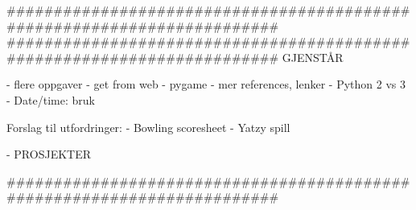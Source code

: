 ########################################################################
########################################################################
GJENSTÅR 

- flere oppgaver
- get from web
- pygame 
- mer references, lenker
- Python 2 vs 3 
- Date/time: bruk 

Forslag til utfordringer:
- Bowling scoresheet
- Yatzy spill

- PROSJEKTER 

########################################################################
